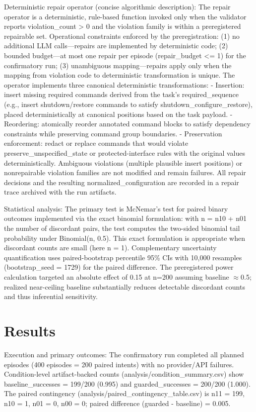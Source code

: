 \documentclass[conference]{IEEEtran}
\begin{document}
Deterministic repair operator (concise algorithmic description): The repair operator is a deterministic, rule-based function invoked only when the validator reports violation\_count > 0 and the violation family is within a preregistered repairable set. Operational constraints enforced by the preregistration: (1) no additional LLM calls---repairs are implemented by deterministic code; (2) bounded budget---at most one repair per episode (repair\_budget <= 1) for the confirmatory run; (3) unambiguous mapping---repairs apply only when the mapping from violation code to deterministic transformation is unique. The operator implements three canonical deterministic transformations:
- Insertion: insert missing required commands derived from the task's required\_sequence (e.g., insert shutdown/restore commands to satisfy shutdown\_configure\_restore), placed deterministically at canonical positions based on the task payload.
- Reordering: atomically reorder annotated command blocks to satisfy dependency constraints while preserving command group boundaries.
- Preservation enforcement: redact or replace commands that would violate preserve\_unspecified\_state or protected-interface rules with the original values deterministically.
Ambiguous violations (multiple plausible insert positions) or nonrepairable violation families are not modified and remain failures. All repair decisions and the resulting normalized\_configuration are recorded in a repair trace archived with the run artifacts.

Statistical analysis: The primary test is McNemar's test for paired binary outcomes implemented via the exact binomial formulation: with n = n10 + n01 the number of discordant pairs, the test computes the two-sided binomial tail probability under Binomial(n, 0.5). This exact formulation is appropriate when discordant counts are small (here n = 1). Complementary uncertainty quantification uses paired-bootstrap percentile 95\% CIs with 10,000 resamples (bootstrap\_seed = 1729) for the paired difference. The preregistered power calculation targeted an absolute effect of 0.15 at n=200 assuming baseline \ensuremath{\approx}0.5; realized near-ceiling baseline substantially reduces detectable discordant counts and thus inferential sensitivity.

\section{Results}
Execution and primary outcomes: The confirmatory run completed all planned episodes (400 episodes = 200 paired intents) with no provider/API failures. Condition-level artifact-backed counts (analysis/condition\_summary.csv) show baseline\_successes = 199/200 (0.995) and guarded\_successes = 200/200 (1.000). The paired contingency (analysis/paired\_contingency\_table.csv) is n11 = 199, n10 = 1, n01 = 0, n00 = 0; paired difference (guarded - baseline) = 0.005.
\end{document}
